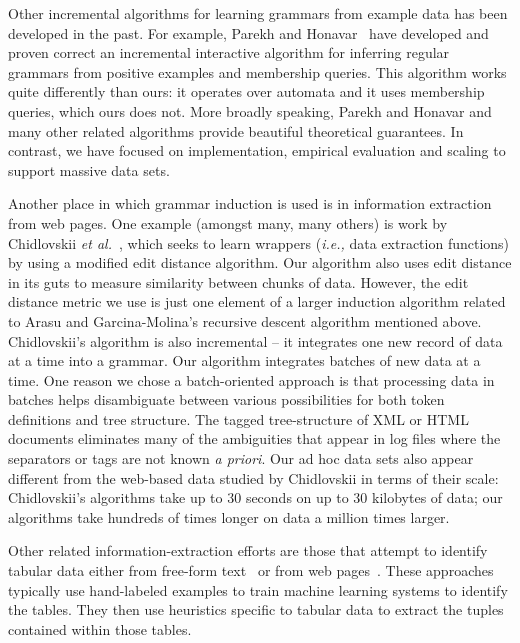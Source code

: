 Other incremental algorithms for learning grammars from example data
has been developed in the past.  For example, Parekh and 
Honavar~\cite{parekh+:incremental} have developed and proven correct
an incremental interactive algorithm for inferring
regular grammars from positive examples and membership queries.
This algorithm works quite differently than ours:  it operates over
automata and it uses membership queries, which ours does not.
More broadly speaking, Parekh and Honavar and many other related algorithms
provide beautiful theoretical guarantees.  In contrast, we have
focused on implementation, empirical 
evaluation and scaling to support massive data sets.

Another place in which grammar induction is used is in information
extraction from web pages.  One example (amongst many, many others) is
work by Chidlovskii {\em et al.}~\cite{chidlovskii+:wrapper-generation},
which seeks to learn wrappers ({\em i.e.,} data extraction functions)
by using a modified edit distance algorithm.  Our algorithm also
uses edit distance in its guts to measure similarity
between chunks of data.  However, the edit distance metric we use is just
one element of a larger induction algorithm related to Arasu and
Garcina-Molina's recursive descent algorithm mentioned above.
Chidlovskii's algorithm is also incremental -- it
integrates one new record of data at a time into a grammar.
Our algorithm integrates batches of new data at a time.  One
reason we chose a batch-oriented approach is that processing
data in batches helps
disambiguate between various possibilities for both token
definitions and tree structure.  The tagged tree-structure of
XML or HTML documents eliminates many of the ambiguities that
appear in log files where the separators or tags are not known
{\em a priori}.  Our ad hoc data sets also appear different
from the web-based data studied by Chidlovskii in terms of their
scale:  Chidlovskii's algorithms take up to
30 seconds on up to 30 kilobytes of data; our algorithms 
take hundreds of times longer on data a million times larger.

Other related information-extraction efforts
are those that attempt to identify tabular data 
either from free-form text~\cite{Ng+:texttables,Pinto+:texttables} or
from web pages~\cite{Lerman+:webtables}.  These approaches typically
use hand-labeled examples to train machine learning systems to
identify the tables.  They then use heuristics specific to tabular
data to extract the tuples contained within those tables.  

